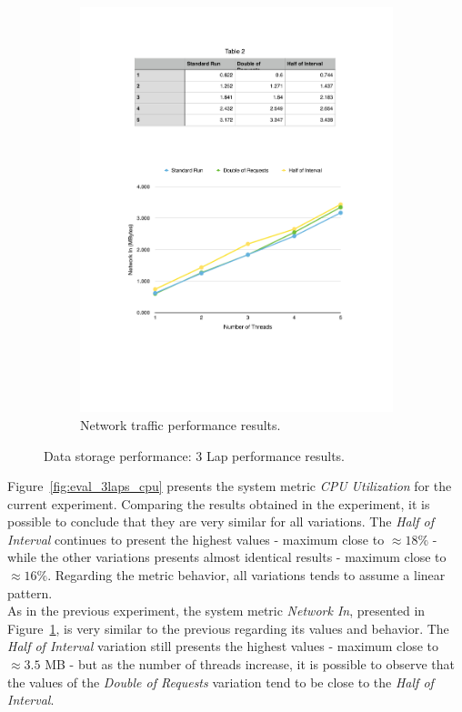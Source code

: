 \begin{figure}[ht!]
\begin{subfigure}{.5\textwidth}
  \includegraphics[width=\linewidth]{./images/network_3_lap}
  \caption{Network traffic performance results.}
  \label{fig:eval_3laps_network}
\end{subfigure}
\caption[Data storage: 3 Lap performance results.]{Data storage performance: 3 Lap performance results.}
\label{fig:eval_3laps_results}
\end{figure}

Figure~\ref{fig:eval_3laps_cpu} presents the system metric \textit{CPU Utilization} for the current
experiment. Comparing the results obtained in the experiment, it is possible to conclude that
they are very similar for all variations. The \textit{Half of Interval} continues to present
the highest values - maximum close to $\approx18\%$ - while the other variations presents almost identical
results - maximum close to $\approx16\%$. Regarding the metric behavior, all variations tends to assume
a linear pattern.\\

As in the previous experiment, the system metric \textit{Network In}, presented in Figure~\ref{fig:eval_3laps_network},
is very similar to the previous regarding its values and behavior. The \textit{Half of Interval}
variation still presents the highest values - maximum close to $\approx3.5$ \gls{MB} - but as the number of
threads increase, it is possible to observe that the values of the \textit{Double of Requests}
variation tend to be close to the \textit{Half of Interval}.

